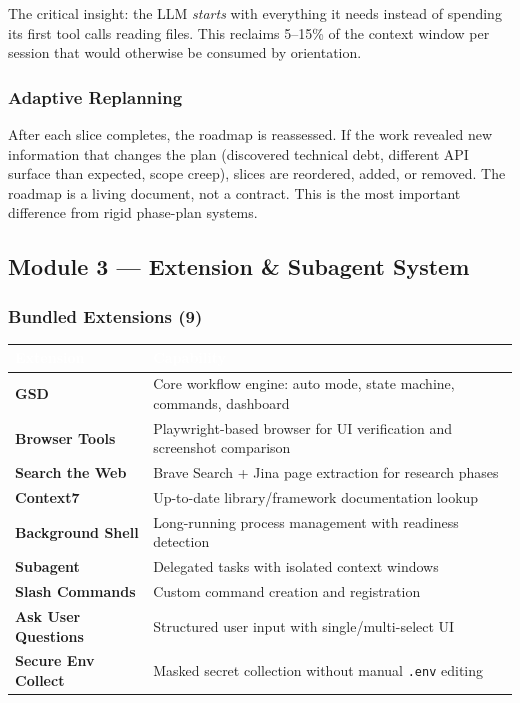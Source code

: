 \documentclass[11pt,letterpaper]{article}
\newcommand{\tableheader}[1]{\textbf{\sffamily\textcolor{white}{#1}}}
\begin{document}
The critical insight: the LLM \emph{starts} with everything it needs instead of spending its first tool calls reading files. This reclaims 5--15\% of the context window per session that would otherwise be consumed by orientation.

\subsubsection{Adaptive Replanning}

After each slice completes, the roadmap is reassessed. If the work revealed new information that changes the plan (discovered technical debt, different API surface than expected, scope creep), slices are reordered, added, or removed. The roadmap is a living document, not a contract. This is the most important difference from rigid phase-plan systems.

\subsection{Module 3 --- Extension \& Subagent System}

\subsubsection{Bundled Extensions (9)}

\begin{center}
\begin{tabularx}{\textwidth}{L{4cm}X}
\toprule
{}
\tableheader{Extension} & \tableheader{Capability} \\
\midrule
\textbf{GSD} & Core workflow engine: auto mode, state machine, commands, dashboard \\
\textbf{Browser Tools} & Playwright-based browser for UI verification and screenshot comparison \\
\textbf{Search the Web} & Brave Search + Jina page extraction for research phases \\
\textbf{Context7} & Up-to-date library/framework documentation lookup \\
\textbf{Background Shell} & Long-running process management with readiness detection \\
\textbf{Subagent} & Delegated tasks with isolated context windows \\
\textbf{Slash Commands} & Custom command creation and registration \\
\textbf{Ask User Questions} & Structured user input with single/multi-select UI \\
\textbf{Secure Env Collect} & Masked secret collection without manual \texttt{.env} editing \\
\bottomrule
\end{tabularx}
\end{center}
\end{document}
